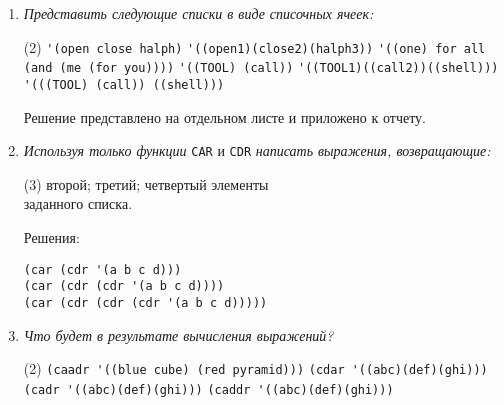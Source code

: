 \begin{enumerate}[wide=0pt]
\item \textit{Представить следующие списки в виде списочных ячеек:}
\begin{tasks}[label=\arabic*), item-indent=3pt, after-item-skip=1pt](2)
	\task \lstinline {'(open close halph)}
	\task \lstinline {'((open1)(close2)(halph3))}
	\task \lstinline {'((one) for all (and (me (for you))))}
	\task \lstinline {'((TOOL) (call))}
	\task \lstinline {'((TOOL1)((call2))((shell)))}
	\task \lstinline {'(((TOOL) (call)) ((shell)))}
\end{tasks}
Решение представлено на отдельном листе и приложено к отчету.
\item  \textit{Используя только функции} \texttt{CAR} и \texttt{CDR} \textit{написать выражения, возвращающие:}
\begin{tasks}[label=\arabic*), item-indent=3pt, after-item-skip=1pt](3)
	\task второй; \task третий; \task четвертый элементы \\ заданного списка.
\end{tasks}
Решения:
\begin{lstlisting}
(car (cdr '(a b c d)))
(car (cdr (cdr '(a b c d))))
(car (cdr (cdr (cdr '(a b c d)))))
\end{lstlisting}
\item \textit{Что будет в результате вычисления выражений?}
\begin{tasks}[label=\arabic*), item-indent=3pt, after-item-skip=1pt, column-sep=20pt](2)
	\task \lstinline{(caadr '((blue cube) (red pyramid)))}
	\task \lstinline{(cdar '((abc)(def)(ghi)))}
	\task \lstinline{(cadr '((abc)(def)(ghi)))}
	\task \lstinline{(caddr '((abc)(def)(ghi)))}
\end{tasks}


\end{enumerate}
